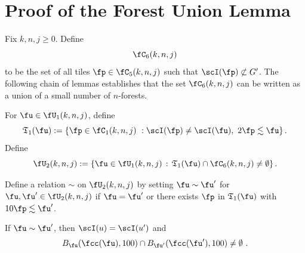 \section{Proof of the Forest Union Lemma}
\label{subsecforest}

Fix $k,n,j\ge 0$.
Define
$$
    \fC_6(k,n,j)
$$
to be the set of all tiles $\fp \in \fC_5(k,n,j)$ such that $\scI(\fp) \not\subset G'$. The following chain of lemmas
establishes that the set $\fC_6(k,n,j)$ can be written as a union of a small number of $n$-forests.

For $\fu\in \fU_1(k,n,j)$, define
\begin{equation}
    \label{eq-T1-def}
    \mathfrak{T}_1(\fu):= \{\fp \in \fC_1(k,n,j) \ : \scI(\fp)\neq \scI(\fu), \ 2\fp \lesssim \fu\}\,.
\end{equation}
Define
\begin{equation}
    \label{eq-U2-def}
    \fU_2(k,n,j) := \{ \fu \in \fU_1(k,n,j) \, : \, \mathfrak{T}_1(\fu) \cap \fC_6(k,n,j) \ne \emptyset\}\,.
\end{equation}

Define a relation $\sim$ on $\fU_2(k,n,j)$
by setting $\fu\sim \fu'$
for $\fu,\fu'\in \fU_2(k,n,j)$
if $\fu=\fu'$ or there exists $\fp$ in $\mathfrak{T}_1(\fu)$
with $10 \fp\lesssim \fu'$.

\begin{lemma}
    \label{relation-geometry}
    \leanok
    If $\fu \sim \fu'$, then $\scI(u) = \scI(u')$ and
    \begin{equation*}
        B_{\fu}(\fcc(\fu), 100) \cap B_{\fu'}(\fcc(\fu'), 100) \neq \emptyset\ .
    \end{equation*}
\end{lemma}

